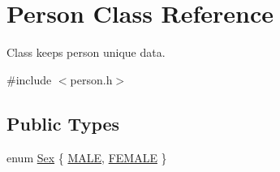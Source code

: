 \hypertarget{classPerson}{
\section{Person Class Reference}
\label{d1/d63/classPerson}
}


Class keeps person unique data.  




{\ttfamily \#include $<$person.h$>$}

\subsection*{Public Types}
\begin{DoxyCompactItemize}
\item 
enum \hyperlink{classPerson_a328ea8d2e8c2674688c7f944fab70b6b}{Sex} \{ \hyperlink{classPerson_a328ea8d2e8c2674688c7f944fab70b6ba16691f7cc6595f87b71d9b43ad23fcb4}{MALE}, 
\hyperlink{classPerson_a328ea8d2e8c2674688c7f944fab70b6ba8ee21010fb2d8e8794ef72be368da064}{FEMALE}
 \}
\end{DoxyCompactItemize}
